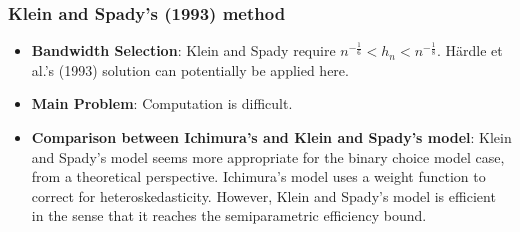 \documentclass{beamer}
\begin{document}
\begin{frame}
\frametitle{Klein and Spady's (1993) method}
\begin{itemize}
	\setlength\itemsep{1.5em}

	\item \textbf{Bandwidth Selection}: Klein and Spady require $ n^{-\frac{1}{6}} < h_n < n^{-\frac{1}{8}}$. H{\"a}rdle et al.'s (1993) solution can potentially be applied here.
	

	\item \textbf{Main Problem}: Computation is difficult.
	
	
	\item \textbf{Comparison between Ichimura's and Klein and Spady's model}:
	Klein and Spady's model seems more appropriate for the binary choice model case, from a theoretical perspective. Ichimura's model uses a weight function to correct for heteroskedasticity. However, Klein and Spady's model is efficient in the sense that it reaches the semiparametric efficiency bound.
	
\end{itemize}
\end{frame}

\end{document}
